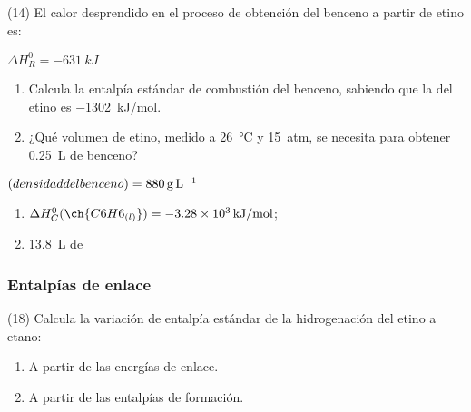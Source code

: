 \documentclass[10pt]{article}
\newenvironment{gexdatos}{
      \noindent\makebox[0pt][r]{\textit{Datos:}}
    }{\vspace{5pt}}
\begin{document}
\begin{multicols}{2}
\begin{exercise}[
    tags    = {},
    topics  = {química, termodinámica, termoquímica},
    source  = {FQ 1B MGH 2016, p180, e14},
  ]
  (14) El calor desprendido en el proceso de obtención del benceno a partir de etino es:

   \( \Delta H^0_R = \SI{-631}{kJ} \)

  \begin{enumerate}
    \item Calcula la entalpía estándar de combustión del benceno, sabiendo que la del etino es \SI{-1302}{kJ/mol}.
    \item ¿Qué volumen de etino, medido a \SI{26}{\celsius} y \SI{15}{atm}, se necesita para obtener \SI{0.25}{\liter} de benceno?
  \end{enumerate}

  \begin{gexdatos}
    \( \textrm(densidad del benceno) = \SI{880}{\gram\per\liter} \)
  \end{gexdatos}
\end{exercise}

\begin{solution}
  \begin{enumerate}
    \item \( \Delta H^0_C (\ch{C6H6_{(l)}}) = \SI{-3.28e3}{kJ/mol} \); \item \SI{13.8}{\liter} de 
  \end{enumerate}
\end{solution}






\subsubsection{Entalpías de enlace}

\begin{exercise}[
    tags    = {},
    topics  = {química, termodinámica, termoquímica},
    source  = {FQ 1B MGH 2016, p180, e18},
  ]
  (18) Calcula la variación de entalpía estándar de la hidrogenación del etino a etano:

  \begin{enumerate}
    \item A partir de las energías de enlace.
    \item A partir de las entalpías de formación.
  \end{enumerate}


\end{exercise}
\end{multicols}
\end{document}
